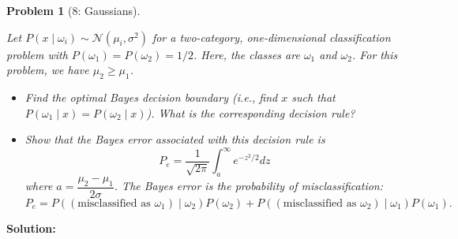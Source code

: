 \documentclass[11pt]{exam}
\theoremstyle{quest}
\newtheorem*{question}{Problem}
\begin{document}
\newpage

\begin{question}[8: Gaussians]
~

Let $P(x \mid \omega_i) \sim \mathcal{N}(\mu_i,\sigma^2)$ for a two-category, one-dimensional classification problem with $P(\omega_1)=P(\omega_2)=1/2$. Here, the classes are $\omega_{1}$ and $\omega_{2}$. For this problem, we have $\mu_{2} \geq \mu_{1}$.
\begin{itemize}
\item[(a)] Find the optimal Bayes decision boundary (i.e., find $x$ such that $P(\omega_{1} \mid x) = P(\omega_{2} \mid x)$). What is the corresponding decision rule?
\item[(b)] Show that the Bayes error associated with this decision rule is
\begin{equation*}
P_e=\frac{1}{\sqrt{2\pi}}\int_{a}^{\infty} e^{-z^{2}/2}dz
\end{equation*}
where $a=\dfrac{\mu_2 - \mu_1}{2\sigma}$. The Bayes error is the probability of misclassification: $$P_{e} = P((\text{misclassified as }\omega_{1}) \mid \omega_{2}) P(\omega_{2}) + P((\text{misclassified as }\omega_{2}) \mid \omega_{1}) P(\omega_{1}).$$
\end{itemize}
\end{question}
\textbf{Solution:}



\end{document}
